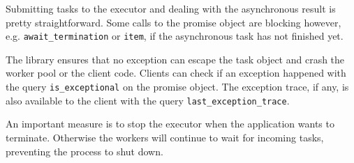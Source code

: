 Submitting tasks to the executor and dealing with the asynchronous result is pretty straightforward.
Some calls to the promise object are blocking however, e.g. \lstinline!await_termination! or \lstinline!item!, if the asynchronous task has not finished yet.

The library ensures that no exception can escape the task object and crash the worker pool or the client code.
Clients can check if an exception happened with the query \lstinline!is_exceptional! on the promise object.
The exception trace, if any, is also available to the client with the query \lstinline!last_exception_trace!.

An important measure is to stop the executor when the application wants to terminate.
Otherwise the workers will continue to wait for incoming tasks, preventing the process to shut down.

